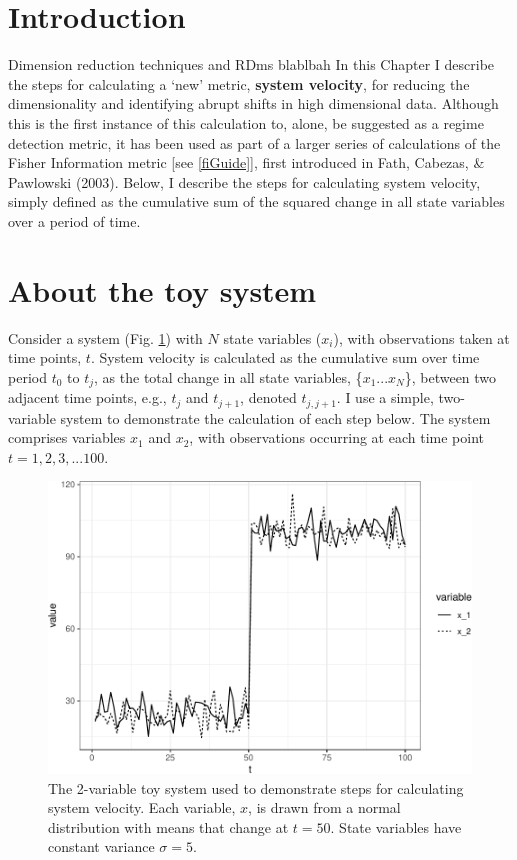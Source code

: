 \documentclass[12pt,twoside,openany]{reedthesis}
\begin{document}
\section{Introduction}\label{introduction-4}

Dimension reduction techniques and RDms blablbah In this Chapter I
describe the steps for calculating a `new' metric, \textbf{system
velocity}, for reducing the dimensionality and identifying abrupt shifts
in high dimensional data. Although this is the first instance of this
calculation to, alone, be suggested as a regime detection metric, it has
been used as part of a larger series of calculations of the Fisher
Information metric {[}see \ref{fiGuide}{]}, first introduced in Fath,
Cabezas, \& Pawlowski (2003). Below, I describe the steps for
calculating system velocity, simply defined as the cumulative sum of the
squared change in all state variables over a period of time.

\section{About the toy system}\label{about-the-toy-system}

Consider a system (Fig. \ref{fig:sysEx}) with \(N\) state variables
(\(x_i\)), with observations taken at time points, \(t\). System
velocity is calculated as the cumulative sum over time period \(t_0\) to
\(t_j\), as the total change in all state variables, \{\(x_1 ...x_N\)\},
between two adjacent time points, e.g., \(t_j\) and \(t_{j+1}\), denoted
\(t_{j,j+1}\). I use a simple, two-variable system to demonstrate the
calculation of each step below. The system comprises variables \(x_1\)
and \(x_2\), with observations occurring at each time point
\(t = {1,2,3,...100}\).
\begin{figure}

{\centering \includegraphics[width=0.95\linewidth]{_myDissertation_files/figure-latex/sysEx-1} 

}

\caption{The 2-variable toy system used to demonstrate steps for calculating system velocity. Each variable, $x$, is drawn from a normal distribution with means that change at $t = 50$. State variables have constant variance $\sigma = 5$. }\label{fig:sysEx}
\end{figure}
\end{document}
